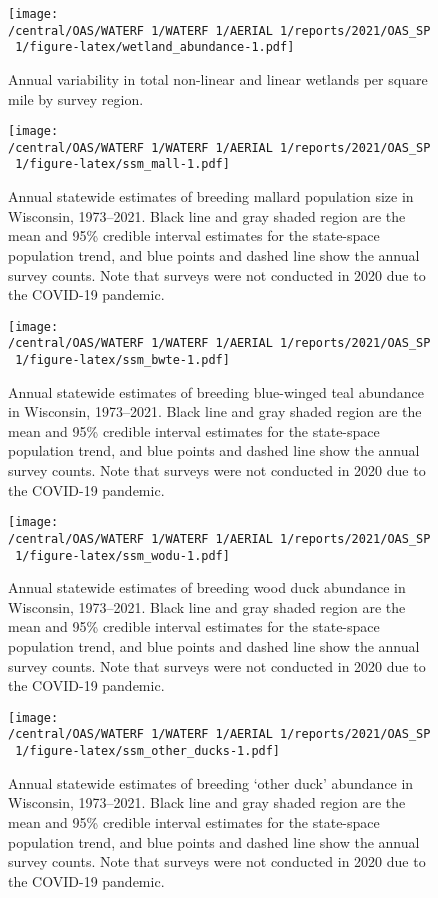 \documentclass[
  12pt,
]{article}
\begin{document}
\newpage

\begin{figure}
\centering
\texttt{[image: /central/OAS/WATERF~1/WATERF~1/AERIAL~1/reports/2021/OAS\_SP~1/figure-latex/wetland\_abundance-1.pdf]}
\caption{\label{fig:wetland_abundance}Annual variability in total
non-linear and linear wetlands per square mile by survey region.}
\end{figure}

\newpage

\begin{figure}
\centering
\texttt{[image: /central/OAS/WATERF~1/WATERF~1/AERIAL~1/reports/2021/OAS\_SP~1/figure-latex/ssm\_mall-1.pdf]}
\caption{\label{fig:ssm_mall}Annual statewide estimates of breeding
mallard population size in Wisconsin, 1973--2021. Black line and gray
shaded region are the mean and 95\% credible interval estimates for the
state-space population trend, and blue points and dashed line show the
annual survey counts. Note that surveys were not conducted in 2020 due
to the COVID-19 pandemic.}
\end{figure}

\newpage

\begin{figure}
\centering
\texttt{[image: /central/OAS/WATERF~1/WATERF~1/AERIAL~1/reports/2021/OAS\_SP~1/figure-latex/ssm\_bwte-1.pdf]}
\caption{\label{fig:ssm_bwte}Annual statewide estimates of breeding
blue-winged teal abundance in Wisconsin, 1973--2021. Black line and gray
shaded region are the mean and 95\% credible interval estimates for the
state-space population trend, and blue points and dashed line show the
annual survey counts. Note that surveys were not conducted in 2020 due
to the COVID-19 pandemic.}
\end{figure}

\newpage

\begin{figure}
\centering
\texttt{[image: /central/OAS/WATERF~1/WATERF~1/AERIAL~1/reports/2021/OAS\_SP~1/figure-latex/ssm\_wodu-1.pdf]}
\caption{\label{fig:ssm_wodu}Annual statewide estimates of breeding wood
duck abundance in Wisconsin, 1973--2021. Black line and gray shaded
region are the mean and 95\% credible interval estimates for the
state-space population trend, and blue points and dashed line show the
annual survey counts. Note that surveys were not conducted in 2020 due
to the COVID-19 pandemic.}
\end{figure}

\newpage

\begin{figure}
\centering
\texttt{[image: /central/OAS/WATERF~1/WATERF~1/AERIAL~1/reports/2021/OAS\_SP~1/figure-latex/ssm\_other\_ducks-1.pdf]}
\caption{\label{fig:ssm_other_ducks}Annual statewide estimates of
breeding `other duck' abundance in Wisconsin, 1973--2021. Black line and
gray shaded region are the mean and 95\% credible interval estimates for
the state-space population trend, and blue points and dashed line show
the annual survey counts. Note that surveys were not conducted in 2020
due to the COVID-19 pandemic.}
\end{figure}
\end{document}
